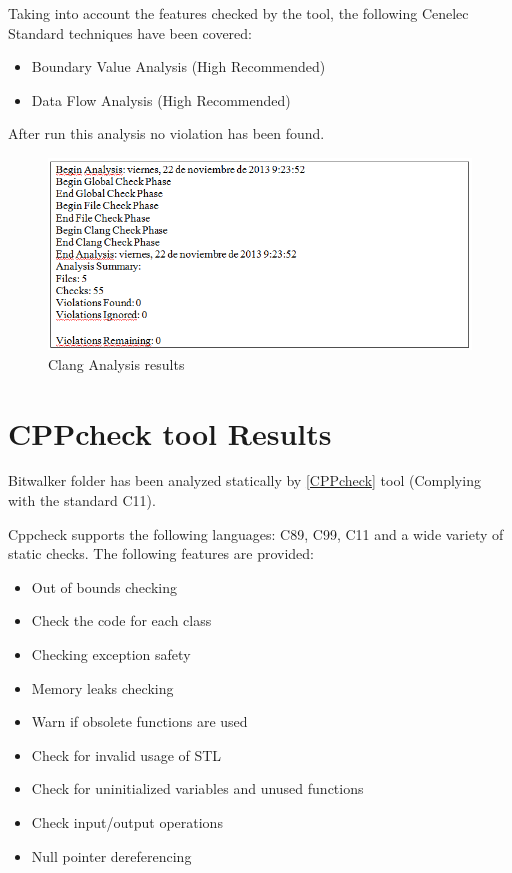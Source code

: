 Taking into account the features checked by the tool, the following Cenelec Standard techniques have been covered:
\begin{itemize}
\item Boundary Value Analysis (High Recommended)
\item Data Flow Analysis (High Recommended)
\end{itemize}

After run this analysis no violation has been found.

\begin{figure}[H]
\centering
\includegraphics[scale=0.8]{./figures/clang.png}
\caption{Clang Analysis results}
\end{figure}

\section{CPPcheck tool Results}

Bitwalker folder has been analyzed statically by \href{http://cppcheck.sourceforge.net/}{[CPPcheck]} tool (Complying with the standard C11).

Cppcheck supports the following languages: C89, C99, C11 and a wide variety of static checks. The following features are provided:
\begin{itemize}
\item Out of bounds checking
\item Check the code for each class
\item Checking exception safety
\item Memory leaks checking
\item Warn if obsolete functions are used
\item Check for invalid usage of STL
\item Check for uninitialized variables and unused functions
\item Check input/output operations
\item Null pointer dereferencing
\end{itemize}

